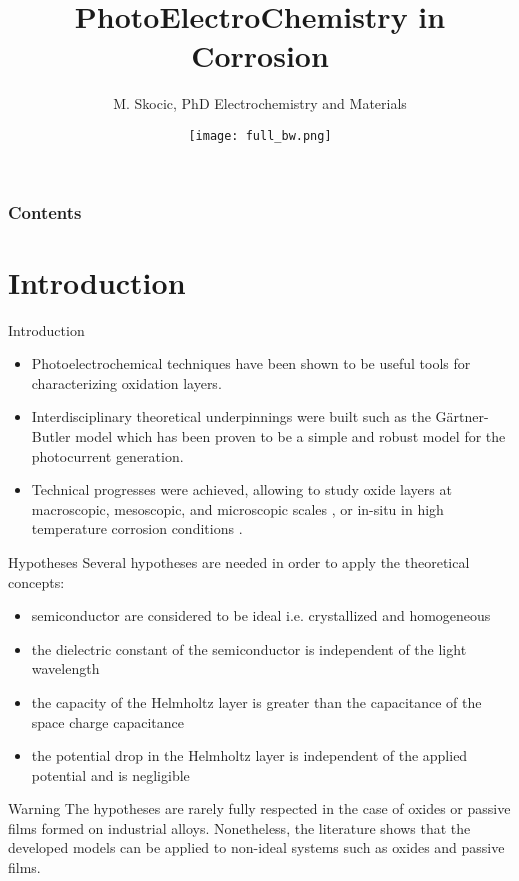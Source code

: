 \documentclass[10pt,compress]{beamer}
\title{PhotoElectroChemistry in Corrosion}
\author{M. Skocic, PhD Electrochemistry and Materials}
\date{\vfill \texttt{[image: full\_bw.png]}}
\begin{document}
\begin{frame}
    \titlepage
\end{frame}

\begin{frame}
    \frametitle{Contents}
    \tableofcontents
\end{frame}



\section{Introduction}
\begin{frame}{Introduction}
    \begin{itemize}
        \item Photoelectrochemical techniques have been shown to be useful tools for characterizing oxidation layers. 
        \item Interdisciplinary theoretical underpinnings were built \citep{morrison1980, vijh1969, stimming1986, diquarto1997, wouters2007} 
              such as the Gärtner-Butler model \citep{gaertner1959,butler1977}
              which has been proven to be a simple and robust model for the photocurrent generation. 
        \item Technical progresses were achieved, allowing to study oxide layers at 
              macroscopic, mesoscopic, and microscopic scales 
              \citep{benaboud2007, srisrual2011}, or in-situ in high temperature corrosion 
              conditions \citep{bojinov2002,skocic2016}.
    \end{itemize}
\end{frame}


\begin{frame}{Hypotheses}
    Several hypotheses are needed in order to apply the theoretical concepts:  
    \begin{itemize}
        \item semiconductor are considered to be ideal i.e. crystallized and homogeneous  
        \item the dielectric constant of the semiconductor is independent of the light wavelength  
        \item the capacity of the Helmholtz layer is greater than the capacitance of the space charge capacitance  
        \item the potential drop in the Helmholtz layer is independent of the applied potential and is negligible
    \end{itemize}

    \footnotesize
    \begin{alertblock}{Warning}
        The hypotheses are rarely fully respected in the case of oxides or passive 
        films formed on industrial alloys. Nonetheless, the literature shows that the 
        developed models can be applied to non-ideal systems such as oxides 
        and passive films.
    \end{alertblock}
\end{frame}
\end{document}
